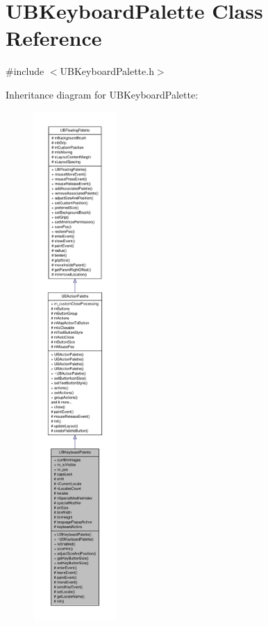 \hypertarget{class_u_b_keyboard_palette}{\section{U\-B\-Keyboard\-Palette Class Reference}
\label{d6/d6e/class_u_b_keyboard_palette}
}


{\ttfamily \#include $<$U\-B\-Keyboard\-Palette.\-h$>$}



Inheritance diagram for U\-B\-Keyboard\-Palette\-:
\nopagebreak
\begin{figure}[H]
\begin{center}
\leavevmode
\includegraphics[height=550pt]{db/d75/class_u_b_keyboard_palette__inherit__graph}
\end{center}
\end{figure}


